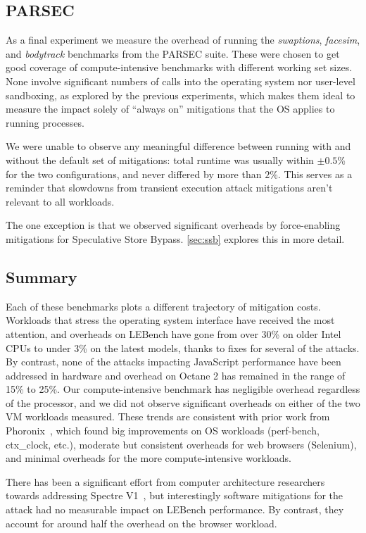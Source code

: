 \subsection{PARSEC}
\label{sec:benchmarks:parsec}
As a final experiment we measure the overhead of running the \textit{swaptions}, \textit{facesim}, and \textit{bodytrack} benchmarks from the PARSEC suite.
These were chosen to get good coverage of compute-intensive benchmarks with different working set sizes.
None involve significant numbers of calls into the operating system nor user-level sandboxing, as explored by the previous experiments, which makes them ideal to measure the impact solely of ``always on'' mitigations that the OS applies to running processes.

We were unable to observe any meaningful difference between running with and without the default set of mitigations: total runtime was usually within $\pm0.5$\% for the two configurations, and never differed by more than $2$\%.
This serves as a reminder that slowdowns from transient execution attack mitigations aren't relevant to all workloads.

The one exception is that we observed significant overheads by force-enabling mitigations for Speculative Store Bypass.
\autoref{sec:ssb} explores this in more detail.

\subsection{Summary}
Each of these benchmarks plots a different trajectory of mitigation costs.
Workloads that stress the operating system interface have received the most attention, and overheads on LEBench have gone from over 30\% on older Intel CPUs to under 3\% on the latest models, thanks to fixes for several of the attacks.
By contrast, none of the attacks impacting JavaScript performance have been addressed in hardware and overhead on Octane 2 has remained in the range of 15\% to 25\%.
Our compute-intensive benchmark has negligible overhead regardless of the processor, and we did not observe significant overheads on either of the two VM workloads measured.
These trends are consistent with prior work from Phoronix~\cite{phoronix:three-years}, which found big improvements on OS workloads (perf-bench, ctx\_clock, etc.), moderate but consistent overheads for web browsers (Selenium), and minimal overheads for the more compute-intensive workloads.

There has been a significant effort from computer architecture researchers towards addressing Spectre V1~\cite{barber:specshield, weisse:nda, ainsworth:muontrap,yu:stt,yu:sdo}, but interestingly software mitigations for the attack had no measurable impact on LEBench performance.
By contrast, they account for around half the overhead on the browser workload.

